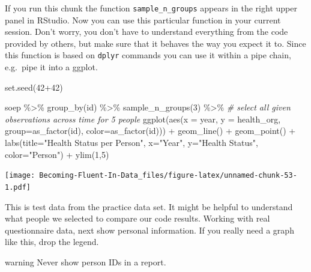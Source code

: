 \documentclass[
]{book}
\newenvironment{Shaded}{\begin{snugshade}}{\end{snugshade}}
\newcommand{\AttributeTok}[1]{\textcolor[rgb]{0.77,0.63,0.00}{#1}}
\newcommand{\CommentTok}[1]{\textcolor[rgb]{0.56,0.35,0.01}{\textit{#1}}}
\newcommand{\DecValTok}[1]{\textcolor[rgb]{0.00,0.00,0.81}{#1}}
\newcommand{\FunctionTok}[1]{\textcolor[rgb]{0.00,0.00,0.00}{#1}}
\newcommand{\NormalTok}[1]{#1}
\newcommand{\SpecialCharTok}[1]{\textcolor[rgb]{0.00,0.00,0.00}{#1}}
\newcommand{\StringTok}[1]{\textcolor[rgb]{0.31,0.60,0.02}{#1}}
\begin{document}
If you run this chunk the function \texttt{sample\_n\_groups} appears in the right upper panel in RStudio. Now you can use this particular function in your current session. Don't worry, you don't have to understand everything from the code provided by others, but make sure that it behaves the way you expect it to. Since this function is based on \texttt{dplyr} commands you can use it within a pipe chain, e.g.~pipe it into a ggplot.

\begin{Shaded}
\begin{Highlighting}[]
\FunctionTok{set.seed}\NormalTok{(}\DecValTok{42}\SpecialCharTok{+}\DecValTok{42}\NormalTok{)}

\NormalTok{soep }\SpecialCharTok{\%\textgreater{}\%} 
  \FunctionTok{group\_by}\NormalTok{(id) }\SpecialCharTok{\%\textgreater{}\%} 
  \FunctionTok{sample\_n\_groups}\NormalTok{(}\DecValTok{3}\NormalTok{) }\SpecialCharTok{\%\textgreater{}\%} \CommentTok{\# select all given observations across time for 5 people }
  \FunctionTok{ggplot}\NormalTok{(}\FunctionTok{aes}\NormalTok{(}\AttributeTok{x =}\NormalTok{ year, }\AttributeTok{y =}\NormalTok{ health\_org, }\AttributeTok{group=}\FunctionTok{as\_factor}\NormalTok{(id), }\AttributeTok{color=}\FunctionTok{as\_factor}\NormalTok{(id))) }\SpecialCharTok{+}  
  \FunctionTok{geom\_line}\NormalTok{() }\SpecialCharTok{+} \FunctionTok{geom\_point}\NormalTok{() }\SpecialCharTok{+}
  \FunctionTok{labs}\NormalTok{(}\AttributeTok{title=}\StringTok{"Health Status per Person"}\NormalTok{, }
       \AttributeTok{x=}\StringTok{"Year"}\NormalTok{, }\AttributeTok{y=}\StringTok{"Health Status"}\NormalTok{, }\AttributeTok{color=}\StringTok{"Person"}\NormalTok{) }\SpecialCharTok{+} 
  \FunctionTok{ylim}\NormalTok{(}\DecValTok{1}\NormalTok{,}\DecValTok{5}\NormalTok{) }
\end{Highlighting}
\end{Shaded}

\texttt{[image: Becoming-Fluent-In-Data\_files/figure-latex/unnamed-chunk-53-1.pdf]}

This is test data from the practice data set. It might be helpful to understand what people we selected to compare our code results. Working with real questionnaire data, next show personal information. If you really need a graph like this, drop the legend.

\begin{infobox2}warning
Never show person IDs in a report.

\end{infobox2}
\end{document}
